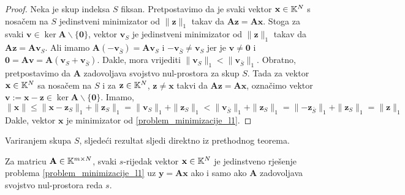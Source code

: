 \documentclass[a4paper,twoside,12pt]{memoir} %
\newcommand{\vect}[1]{\mathbf{#1}}
\renewcommand{\vec}{\vect}
\newcommand{\norm}[1]{\|{#1}\|}
\begin{document}
\begin{proof}
    Neka je skup indeksa $S$ fiksan. Pretpostavimo da je svaki vektor $\vec x \in \K^N$ s nosa\v{c}em na $S$ jedinstveni minimizator od $\norm{\vec z}_1$ takav da $\vec {Az} = \vec {Ax}$. Stoga za svaki $\vec v \in \ker \vec A \backslash \{\vec 0\}$, vektor $\vec v_S$ je jedinstveni minimizator od $\norm{\vec z}_1$ takav da $\vec{Az} = \vec{Av}_S$. Ali imamo $\vec A (-\vec v_{\bar S}) = \vec A \vec v_S$ i $-\vec v_{\bar S} \neq \vec v_S$ jer je $\vec v \neq \vec 0$ i $ \vec 0 = \vec{Av} = \vec A (\vec v_S + \vec v_{\bar S})$. Dakle, mora vrijediti $\norm{\vec v_S}_1 < \norm{\vec v_{\bar S}}_1$.
\indent
Obratno, pretpostavimo da $\vec A$ zadovoljava svojstvo nul-prostora za skup $S$. Tada za vektor $\vec x \in \K^N$ sa nosa\v{c}em na $S$ i za $\vec z \in \K^N$, $\vec z \neq \vec x$ takvi da $\vec{Az}=\vec{Ax}$, ozna\v{c}imo vektor $\vec v := \vec x - \vec z \in \ker \vec A \backslash \{\vec 0\}$. Imamo,
\begin{equation*}
    \norm{\vec x} \leq \norm{\vec x - \vec z_S}_1 + \norm{\vec z_S}_1 = \norm{\vec v_S}_1 + \norm{\vec z_S}_1 < \norm{\vec v_{\bar S}}_1 + \norm{\vec z_S}_1 = \norm{- \vec z_{\bar S}}_1 + \norm{\vec z_S}_1 = \norm{\vec z}_1
\end{equation*}
Dakle, vektor $\vec x$ je minimizator od \eqref{problem_minimizacije_l1}.
\end{proof}

\indent
Variranjem skupa $S$, sljede\'ci rezultat sljedi direktno iz prethodnog teorema. 

\begin{thm}\label{svojstvo_nul_prostora_tm}
    Za matricu $\vec A \in \K^{m \times N}$, svaki $s$-rijedak vektor $\vec x \in \K^N$ je jedinstveno rje\v{s}enje problema \eqref{problem_minimizacije_l1} uz $\vec y = \vec{Ax}$ ako i samo ako $\vec A$ zadovoljava svojstvo nul-prostora reda $s$.
\end{thm}
\end{document}
